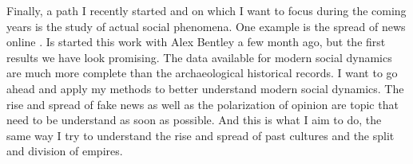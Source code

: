 \documentclass[10pt]{article}
\begin{document}
Finally, a path I recently started and on which I want to focus during the coming years is the study of actual social phenomena.  One example is the spread of news online \cite{carrignon2018}. Is started this work with Alex Bentley a few month ago, but the first results we have look promising. The data available for modern social dynamics are much more complete than the archaeological historical records.  I want to go ahead and apply my methods to better understand modern social dynamics. The rise and spread of fake news as well as the polarization of opinion  are topic that need to be understand as soon as possible.  And this is what I aim to do, the same way I try to understand the rise and spread of past cultures and the split and division of empires. 

%
%
%
\end{document}
